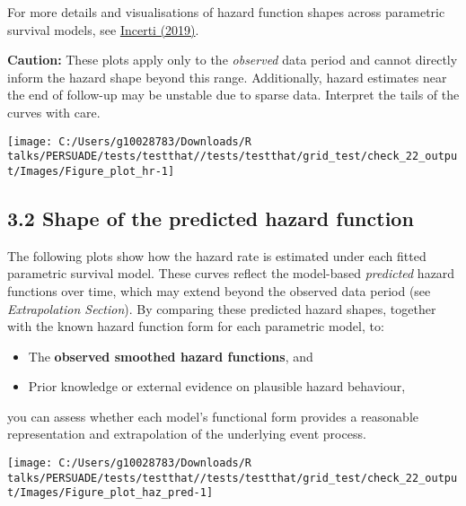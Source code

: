 \documentclass[
]{article}
\providecommand{\tightlist}{%
  \setlength{\itemsep}{0pt}\setlength{\parskip}{0pt}}
\begin{document}
For more details and visualisations of hazard function shapes across
parametric survival models, see
\href{https://devinincerti.com/2019/06/18/parametric_survival.html}{Incerti
(2019)}.

\textbf{Caution:} These plots apply only to the \emph{observed} data
period and cannot directly inform the hazard shape beyond this range.
Additionally, hazard estimates near the end of follow-up may be unstable
due to sparse data. Interpret the tails of the curves with care.

\clearpage

\begin{flushleft}\texttt{[image: C:/Users/g10028783/Downloads/R talks/PERSUADE/tests/testthat//tests/testthat/grid\_test/check\_22\_output/Images/Figure\_plot\_hr-1]} \end{flushleft}

\clearpage

\subsection{3.2 Shape of the predicted hazard
function}\label{shape-of-the-predicted-hazard-function}

The following plots show how the hazard rate is estimated under each
fitted parametric survival model. These curves reflect the model-based
\emph{predicted} hazard functions over time, which may extend beyond the
observed data period (see \emph{Extrapolation Section}). By comparing
these predicted hazard shapes, together with the known hazard function
form for each parametric model, to:

\begin{itemize}
\tightlist
\item
  The \textbf{observed smoothed hazard functions}, and\\
\item
  Prior knowledge or external evidence on plausible hazard behaviour,
\end{itemize}

you can assess whether each model's functional form provides a
reasonable representation and extrapolation of the underlying event
process.

\clearpage

\begin{flushleft}\texttt{[image: C:/Users/g10028783/Downloads/R talks/PERSUADE/tests/testthat//tests/testthat/grid\_test/check\_22\_output/Images/Figure\_plot\_haz\_pred-1]} \end{flushleft}
\end{document}

